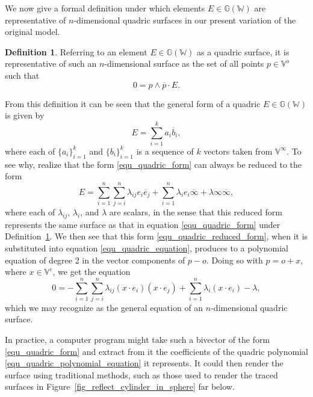 \documentclass{birkjour}
\theoremstyle{definition}
\newtheorem{defn}[thm]{Definition}
\theoremstyle{remark}
\numberwithin{equation}{section}
\newcommand{\G}{\mathbb{G}}
\newcommand{\V}{\mathbb{V}}
\newcommand{\W}{\mathbb{W}}
\newcommand{\nvao}{o}
\newcommand{\nvai}{\infty}
\newcommand{\nvaib}{\overline{\infty}}
\begin{document}
We now give a formal definition under which elements $E\in\G(\W)$
are representative of $n$-dimensional quadric surfaces in our present variation
of the original model.
\begin{defn}\label{def_quadric}
Referring to an element $E\in\G(\W)$ as a quadric surface, it is representative of such an $n$-dimensional surface as the set of all points $p\in\V^o$ such that
\begin{equation}\label{equ_quadric_equation}
0 = p\wedge\overline{p}\cdot E.
\end{equation}
\end{defn}
From this definition it can be seen that the general form of a quadric $E\in\G(\W)$ is given by
\begin{equation}\label{equ_quadric_form}
E = \sum_{i=1}^k a_i\overline{b}_i,
\end{equation}
where each of $\{a_i\}_{i=1}^k$ and $\{b_i\}_{i=1}^k$ is a sequence of $k$ vectors
taken from $\V^\nvai$.  To see why, realize that the form \eqref{equ_quadric_form} can
always be reduced to the form
\begin{equation}\label{equ_quadric_reduced_form}
E = \sum_{i=1}^n\sum_{j=i}^n\lambda_{ij}e_i\overline{e}_j+
\sum_{i=1}^n\lambda_i e_i\nvaib+
\lambda\nvai\nvaib,
\end{equation}
where each of $\lambda_{ij}$, $\lambda_i$, and $\lambda$ are scalars, in the
sense that this reduced form represents the same surface as that in equation \eqref{equ_quadric_form}
under Definition~\ref{def_quadric}.
We then see that this form \eqref{equ_quadric_reduced_form}, when it is
substituted into equation \eqref{equ_quadric_equation}, produces to a polynomial
equation of degree 2 in the vector components of $p-\nvao$.
Doing so with $p=\nvao+x$, where $x\in\V^e$, we get the equation
\begin{equation}\label{equ_quadric_polynomial_equation}
0 = -\sum_{i=1}^n\sum_{j=i}^n\lambda_{ij}(x\cdot e_i)(x\cdot e_j)
+\sum_{i=1}^n\lambda_i(x\cdot e_i) - \lambda,
\end{equation}
which we may recognize as the general equation of an $n$-dimensional quadric surface.

In practice, a computer program might take such a bivector of the form \eqref{equ_quadric_form}
and extract from it the coefficients of the quadric polynomial \eqref{equ_quadric_polynomial_equation} it
represents.  It could then render the surface using traditional methods, such as those used
to render the traced surfaces in Figure~\ref{fig_reflect_cylinder_in_sphere} far below.
\end{document}
